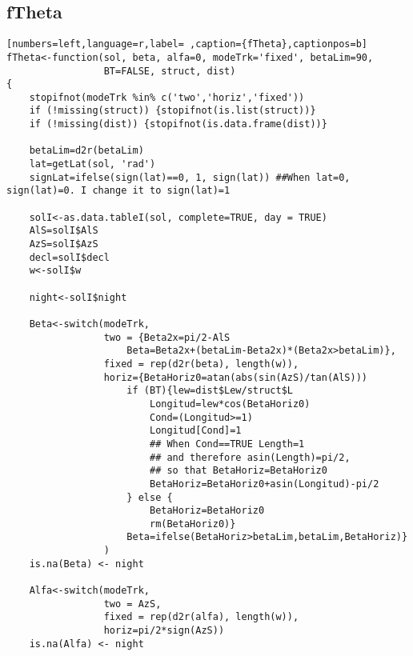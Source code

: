 \subsection{fTheta}
\label{sec:orgffea5c5}
\begin{lstlisting}[numbers=left,language=r,label= ,caption={fTheta},captionpos=b]
fTheta<-function(sol, beta, alfa=0, modeTrk='fixed', betaLim=90, 
                 BT=FALSE, struct, dist)
{
    stopifnot(modeTrk %in% c('two','horiz','fixed'))
    if (!missing(struct)) {stopifnot(is.list(struct))}
    if (!missing(dist)) {stopifnot(is.data.frame(dist))}

    betaLim=d2r(betaLim)
    lat=getLat(sol, 'rad')
    signLat=ifelse(sign(lat)==0, 1, sign(lat)) ##When lat=0, sign(lat)=0. I change it to sign(lat)=1

    solI<-as.data.tableI(sol, complete=TRUE, day = TRUE)
    AlS=solI$AlS
    AzS=solI$AzS
    decl=solI$decl
    w<-solI$w

    night<-solI$night

    Beta<-switch(modeTrk,
                 two = {Beta2x=pi/2-AlS	
                     Beta=Beta2x+(betaLim-Beta2x)*(Beta2x>betaLim)},
                 fixed = rep(d2r(beta), length(w)), 
                 horiz={BetaHoriz0=atan(abs(sin(AzS)/tan(AlS)))
                     if (BT){lew=dist$Lew/struct$L
                         Longitud=lew*cos(BetaHoriz0)
                         Cond=(Longitud>=1)
                         Longitud[Cond]=1
                         ## When Cond==TRUE Length=1
                         ## and therefore asin(Length)=pi/2,
                         ## so that BetaHoriz=BetaHoriz0
                         BetaHoriz=BetaHoriz0+asin(Longitud)-pi/2                                     
                     } else {
                         BetaHoriz=BetaHoriz0
                         rm(BetaHoriz0)}
                     Beta=ifelse(BetaHoriz>betaLim,betaLim,BetaHoriz)}
                 )
    is.na(Beta) <- night

    Alfa<-switch(modeTrk,
                 two = AzS,
                 fixed = rep(d2r(alfa), length(w)),
                 horiz=pi/2*sign(AzS))
    is.na(Alfa) <- night


\end{lstlisting}
